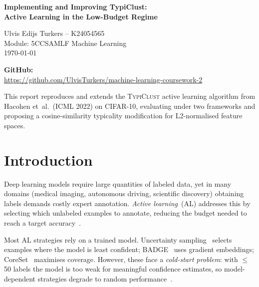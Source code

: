 \documentclass[10pt, conference, twocolumn]{IEEEtran}
\newcommand{\typiclust}{\textsc{TypiClust}}
\begin{document}
\onecolumn
\thispagestyle{empty}

\vspace*{4cm}
\begin{center}
  {\LARGE\bfseries Implementing and Improving TypiClust:\\[4pt]
   Active Learning in the Low-Budget Regime\par}
  \vspace{1.2cm}
  {\large Ulvis Edijs Turkers \quad -- \quad K24054565}\\[6pt]
  {\large Module: 5CCSAMLF Machine Learning}\\[6pt]
  {\large \today}
  \vspace{1.5cm}

  \textbf{GitHub:}\\
  \url{https://github.com/UlvisTurkers/machine-learning-coursework-2}

  \vspace{2cm}
  {\small This report reproduces and extends the \typiclust{} active
  learning algorithm from Hacohen et~al.\ (ICML 2022) on CIFAR-10,
  evaluating under two frameworks and proposing a cosine-similarity
  typicality modification for L2-normalised feature spaces.}
\end{center}

\clearpage
\twocolumn
\setcounter{page}{1}



\section{Introduction}
\label{sec:intro}

Deep learning models require large quantities of labeled data, yet in
many domains (medical imaging, autonomous driving, scientific discovery)
obtaining labels demands costly expert annotation.
\emph{Active learning}~(AL) addresses this by selecting which unlabeled
examples to annotate, reducing the budget needed to reach a target
accuracy~\cite{settles2009active}.

Most AL strategies rely on a trained model.  Uncertainty
sampling~\cite{lewis1994sequential} selects examples where the model is
least confident; BADGE~\cite{ash2020badge} uses gradient embeddings;
CoreSet~\cite{sener2018active} maximises coverage.  However, these face
a \emph{cold-start problem}: with $\leq$50 labels the model is too weak
for meaningful confidence estimates, so model-dependent strategies
degrade to random performance~\cite{hacohen2022active}.
\end{document}
